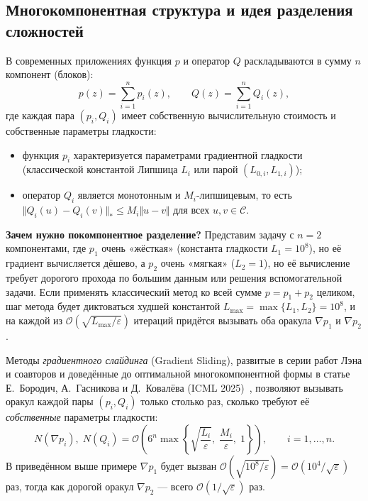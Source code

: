 \documentclass[11pt, a4paper]{article}
\theoremstyle{definition}
\begin{document}
\subsection{Многокомпонентная структура и идея разделения сложностей}

В современных приложениях функция $p$ и оператор $Q$ раскладываются в сумму $n$ компонент (блоков):
\begin{equation}\label{eq:sum_structure}
p(z) = \sum_{i=1}^n p_i(z), \qquad Q(z) = \sum_{i=1}^n Q_i(z),
\end{equation}
где каждая пара $(p_i, Q_i)$ имеет собственную вычислительную стоимость и собственные параметры гладкости:
\begin{itemize}
    \item функция $p_i$ характеризуется параметрами градиентной гладкости (классической константой Липшица $L_i$ или парой $(L_{0,i}, L_{1,i})$);
    \item оператор $Q_i$ является монотонным и $M_i$-липшицевым, то есть $\Vert Q_i(u) - Q_i(v) \Vert_* \le M_i \Vert u - v \Vert$ для всех $u, v \in \mathcal{C}$.
\end{itemize}

\textbf{Зачем нужно покомпонентное разделение?} Представим задачу с $n = 2$ компонентами, где $p_1$ очень «жёсткая» (константа гладкости $L_1 = 10^8$), но её градиент вычисляется дёшево, а $p_2$ очень «мягкая» ($L_2 = 1$), но её вычисление требует дорогого прохода по большим данным или решения вспомогательной задачи. Если применять классический метод ко всей сумме $p = p_1 + p_2$ целиком, шаг метода будет диктоваться худшей константой $L_{\max} = \max\{L_1, L_2\} = 10^8$, и на каждой из $\mathcal{O}(\sqrt{L_{\max}/\varepsilon})$ итераций придётся вызывать оба оракула $\nabla p_1$ и $\nabla p_2$.

Методы \emph{градиентного слайдинга} (Gradient Sliding), развитые в серии работ Лэна и соавторов и доведённые до оптимальной многокомпонентной формы в статье Е.~Бородич, А.~Гасникова и Д.~Ковалёва (ICML 2025)~\cite{Borodich2025}, позволяют вызывать оракул каждой пары $(p_i, Q_i)$ только столько раз, сколько требуют её \emph{собственные} параметры гладкости:
\begin{equation}\label{eq:borodich_classical_rate}
N(\nabla p_i),\; N(Q_i) = \mathcal{O}\!\left(6^n \max\left\{\sqrt{\frac{L_i}{\varepsilon}},\; \frac{M_i}{\varepsilon},\; 1\right\}\right), \qquad i = 1, \dots, n.
\end{equation}
В приведённом выше примере $\nabla p_1$ будет вызван $\mathcal{O}(\sqrt{10^8/\varepsilon}) = \mathcal{O}(10^4/\sqrt{\varepsilon})$ раз, тогда как дорогой оракул $\nabla p_2$ --- всего $\mathcal{O}(1/\sqrt{\varepsilon})$ раз.
\end{document}
